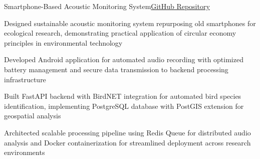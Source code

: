 \begin{joblong}{Smartphone-Based Acoustic Monitoring System}{\href{https://github.com/Microwave-WYB/phone-sensors}{GitHub Repository}}
	\item Designed sustainable acoustic monitoring system repurposing old smartphones for ecological research, demonstrating practical application of circular economy principles in environmental technology
	\item Developed Android application for automated audio recording with optimized battery management and secure data transmission to backend processing infrastructure
	\item Built FastAPI backend with BirdNET integration for automated bird species identification, implementing PostgreSQL database with PostGIS extension for geospatial analysis
	\item Architected scalable processing pipeline using Redis Queue for distributed audio analysis and Docker containerization for streamlined deployment across research environments
\end{joblong}
